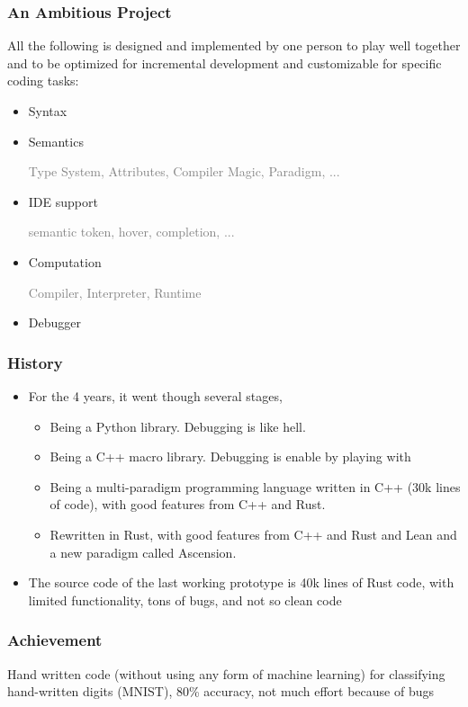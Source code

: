 \documentclass{beamer}   	%
\theoremstyle{definition}
\begin{document}
\begin{frame}
\frametitle{An Ambitious Project}
All the following is designed and implemented by one person to play well together and to be optimized for incremental development and customizable for specific coding tasks:
\begin{itemize}
	\item Syntax
	\item Semantics

	\textcolor{gray}{Type System, Attributes, Compiler Magic, Paradigm, ...}
	\item IDE support

	\textcolor{gray}{semantic token, hover, completion, ...}
	\item Computation

	\textcolor{gray}{Compiler, Interpreter, Runtime}
	\item Debugger
\end{itemize}
\end{frame}

\begin{frame}
\frametitle{History}
\begin{itemize}
	\item For the 4 years, it went though several stages,
	\begin{itemize}
		\item Being a Python library. Debugging is like hell.
		\item Being a C++ macro library. Debugging is enable by playing with
		\item Being a multi-paradigm programming language written in C++ (30k lines of code), with good features from C++ and Rust.
		\item Rewritten in Rust, with good features from C++ and Rust and Lean and a new paradigm called Ascension.
	\end{itemize}
	\item The source code of the last working prototype is 40k lines of Rust code, with limited functionality, tons of bugs, and not so clean code
\end{itemize}
\end{frame}

\begin{frame}
\frametitle{Achievement} Hand written code (without using any form of machine learning) for classifying hand-written digits (MNIST), 80\% accuracy, not much effort because of bugs
\end{frame}
\end{document}

